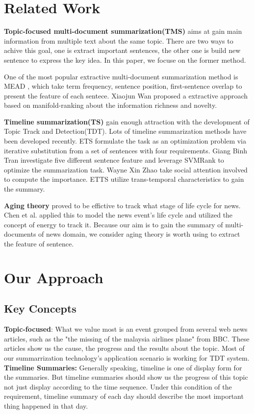 \documentclass{llncs}
\begin{document}
%
\section{Related Work}
%
\textbf{Topic-focused multi-document summarization(TMS)} aims at gain main information from multiple text about the same topic. There are two ways to achive this goal, one is extract important sentences, the other one is build new sentence to express the key idea. In this paper, we focuse on the former method.

One of the most popular extractive multi-document summarization method is MEAD \cite{2004-Radev-p919-938}, which take term frequency, sentence position, first-sentence overlap to present the feature of each sentece. Xiaojun Wan \cite{wan2007manifold} proposed a extractive approach based on manifold-ranking about the information richness and novelty.

\textbf{Timeline summarization(TS)} gain enough attraction with the development of Topic Track and Detection(TDT). Lots of timeline summarization methods have been developed recently. ETS \cite{2011-Yan-p745-754} formulate the task as an optimization  problem via iterative substitution from a set of sentences with four requirements. Giang Binh Tran\cite{tran2013leveraging} investigate five different sentence feature and leverage SVMRank to optimize the summarization task. Wayne Xin Zhao \cite{zhao2013timeline} take social attention involved to compute the importance. ETTS \cite{yan2011timeline} utilize trans-temporal characteristics to gain the summary. 
 
\textbf{Aging theory} proved to be effictive to track what stage of life cycle for news. Chen et al. \cite{2007-Chen-p1016-1025} \cite{2003-Chen-p47-59} applied this to model the news event's life cycle and utilized the concept of energy to track it. Because our aim is to gain the summary of multi-documents of news domain, we consider aging theory is worth using to extract the feature of sentence.




%
\section{Our Approach}
%

\subsection{Key Concepts}
\textbf{Topic-focused}: What we value most is an event grouped from several web news articles, such as the  "the missing of the malaysia airlines plane" from BBC. These articles show us the cause, the progress and the results about the topic. Most of our summarrization technology's application scenario is working for TDT system. \textbf{Timeline Summaries:} Generally speaking, timeline is one of display form for the summaries. But timeline summaries should show us the progress of this topic not just display according to the time sequence. Under this condition of the requirement, timeline summary of each day should describe the most important thing happened in that day.
\end{document}
